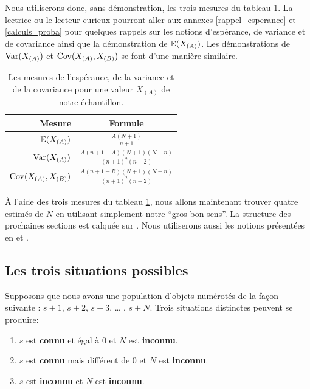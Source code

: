 \documentclass[10pt]{article}
\begin{document}
Nous utiliserons donc, sans démonstration, les trois mesures du tableau
\ref{tab:mesures_stat}. La lectrice ou le lecteur curieux pourront aller
aux annexes \ref{rappel_esperance} et \ref{calculs_proba} pour quelques
rappels sur les notions d'espérance, de variance et de covariance ainsi
que la démonstration de \(\operatorname{\mathbb{E}}(X_{(A)})\). Les démonstrations de
\(\operatorname{Var}(X_{(A)})\) et \(\operatorname{Cov}(X_{(A)},X_{(B)})\) se font d'une manière
similaire.

\begin{table}[ht]
\begin{center}
\begin{tabular}{|r|c|}
\hline
Mesure & Formule \\
\hline
\hline
$\operatorname{\mathbb{E}} (X_{(A)})$ & $\frac{A(N+1)}{n+1}$ \\ 
\hline
$\operatorname{Var}(X_{(A)})$ & $\frac{A(n+1-A)(N+1)(N-n)}{(n+1)^2(n+2)}$ \\
\hline
$\operatorname{Cov}(X_{(A)},X_{(B)})$ & $\frac{A(n+1-B)(N+1)(N-n)}{(n+1)^2(n+2)}$ \\
\hline
\end{tabular}
\end{center}
\caption{\label{tab:mesures_stat} {Les mesures de l'espérance, de la variance et de la covariance pour une valeur $X_{(A)}$ de notre échantillon.} }
\end{table}

À l'aide des trois mesures du tableau \ref{tab:mesures_stat}, nous
allons maintenant trouver quatre estimés de \(N\) en utilisant
simplement notre ``gros bon sens''. La structure des prochaines sections
est calquée sur \cite{Johnson}. Nous utiliserons aussi les notions
présentées en \cite{Goodman1952} et \cite{Goodman1954}.

\hypertarget{les-trois-situations-possibles}{%
\subsection{Les trois situations
possibles}\label{les-trois-situations-possibles}}

Supposons que nous avons une population d'objets numérotés de la façon
suivante : \(s+1\), \(s+2\), \(s+3\), \ldots{} , \(s+N\). Trois
situations distinctes peuvent se produire:

\begin{enumerate}
\def\labelenumi{\arabic{enumi}.}
\item
  \(s\) est \textbf{connu} et égal à \(0\) et \(N\) est
  \textbf{inconnu}.
\item
  \(s\) est \textbf{connu} mais différent de \(0\) et \(N\) est
  \textbf{inconnu}.
\item
  \(s\) est \textbf{inconnu} et \(N\) est \textbf{inconnu}.
\end{enumerate}
\end{document}
